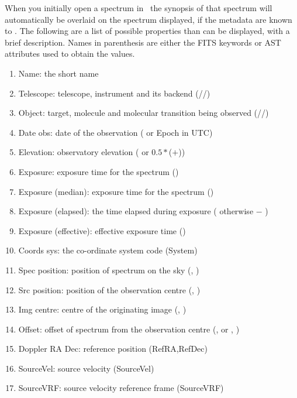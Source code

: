 \documentclass[11pt,oneside,chapters]{starlink}
\providecommand{\att}[1]{\textsf{#1}}
\begin{document}
When you initially open a spectrum in \splat\ the synopsis of that spectrum
will automatically be overlaid on the spectrum displayed, if the metadata are
known to \splat. The following are a list of possible properties
than can be displayed, with a brief description. Names in parenthesis
are either the FITS keywords or AST attributes used to obtain the values.

\begin{enumerate}
\item  Name: the short name
\item  Telescope: telescope, instrument and its backend
       (//)
\item  Object: target, molecule and molecular transition being
       observed (//)
\item  Date obs: date of the observation ( or \att{Epoch} in UTC)
\item  Elevation: observatory elevation ( or
       $0.5 * $($+$))
\item  Exposure: exposure time for the spectrum ()
\item  Exposure (median): exposure time for the spectrum ()
\item  Exposure (elapsed): the time elapsed during exposure (
       otherwise  $-$ )
\item  Exposure (effective): effective exposure time ()
\item  Coords sys: the co-ordinate system code (\att{System})
\item  Spec position: position of spectrum on the sky (, )
\item  Src position: position of the observation centre (, )
\item  Img centre: centre of the originating image (, )
\item  Offset: offset of spectrum from the observation centre
       (,  or , )
\item  Doppler RA Dec: reference position (\att{RefRA},\att{RefDec})
\item  SourceVel: source velocity (\att{SourceVel})
\item  SourceVRF: source velocity reference frame (\att{SourceVRF})

\end{enumerate}
\end{document}
